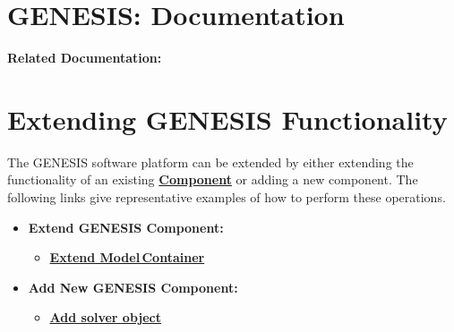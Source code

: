 \documentclass[12pt]{article}
\begin{document}
\section*{GENESIS: Documentation}

{\bf Related Documentation:}

\section*{Extending GENESIS Functionality}

The GENESIS software platform can be extended by either extending the functionality of an existing \href{../reserved-words/reserved-words.tex}{\bf Component} or adding a new component. The following links give representative examples of how to perform these operations.

\begin{itemize}
   \item[]{\bf Extend GENESIS Component:}
      \begin{itemize}
         \item[]\href{../genesis-extend-model-container/genesis-extend-model-container.tex}{\bf Extend Model\,Container}
      \end{itemize}
      
   \item[]{\bf Add New GENESIS Component:}
      \begin{itemize}
         \item[]\href{../genesis-add-object-solver/genesis-add-object-solver.tex}{\bf Add solver object}
      \end{itemize}
   
\end{itemize}
\end{document}

